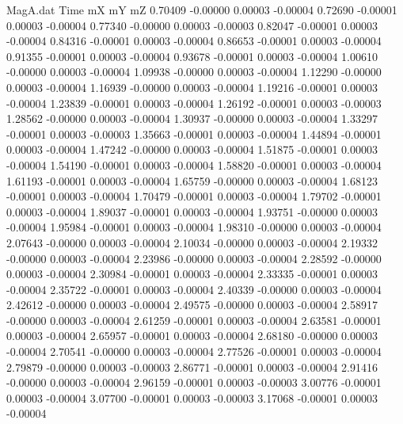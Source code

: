 \begin{filecontents}{MagA.dat}
Time mX mY mZ
   0.70409   -0.00000    0.00003   -0.00004
   0.72690   -0.00001    0.00003   -0.00004
   0.77340   -0.00000    0.00003   -0.00003
   0.82047   -0.00001    0.00003   -0.00004
   0.84316   -0.00001    0.00003   -0.00004
   0.86653   -0.00001    0.00003   -0.00004
   0.91355   -0.00001    0.00003   -0.00004
   0.93678   -0.00001    0.00003   -0.00004
   1.00610   -0.00000    0.00003   -0.00004
   1.09938   -0.00000    0.00003   -0.00004
   1.12290   -0.00000    0.00003   -0.00004
   1.16939   -0.00000    0.00003   -0.00004
   1.19216   -0.00001    0.00003   -0.00004
   1.23839   -0.00001    0.00003   -0.00004
   1.26192   -0.00001    0.00003   -0.00003
   1.28562   -0.00000    0.00003   -0.00004
   1.30937   -0.00000    0.00003   -0.00004
   1.33297   -0.00001    0.00003   -0.00003
   1.35663   -0.00001    0.00003   -0.00004
   1.44894   -0.00001    0.00003   -0.00004
   1.47242   -0.00000    0.00003   -0.00004
   1.51875   -0.00001    0.00003   -0.00004
   1.54190   -0.00001    0.00003   -0.00004
   1.58820   -0.00001    0.00003   -0.00004
   1.61193   -0.00001    0.00003   -0.00004
   1.65759   -0.00000    0.00003   -0.00004
   1.68123   -0.00001    0.00003   -0.00004
   1.70479   -0.00001    0.00003   -0.00004
   1.79702   -0.00001    0.00003   -0.00004
   1.89037   -0.00001    0.00003   -0.00004
   1.93751   -0.00000    0.00003   -0.00004
   1.95984   -0.00001    0.00003   -0.00004
   1.98310   -0.00000    0.00003   -0.00004
   2.07643   -0.00000    0.00003   -0.00004
   2.10034   -0.00000    0.00003   -0.00004
   2.19332   -0.00000    0.00003   -0.00004
   2.23986   -0.00000    0.00003   -0.00004
   2.28592   -0.00000    0.00003   -0.00004
   2.30984   -0.00001    0.00003   -0.00004
   2.33335   -0.00001    0.00003   -0.00004
   2.35722   -0.00001    0.00003   -0.00004
   2.40339   -0.00000    0.00003   -0.00004
   2.42612   -0.00000    0.00003   -0.00004
   2.49575   -0.00000    0.00003   -0.00004
   2.58917   -0.00000    0.00003   -0.00004
   2.61259   -0.00001    0.00003   -0.00004
   2.63581   -0.00001    0.00003   -0.00004
   2.65957   -0.00001    0.00003   -0.00004
   2.68180   -0.00000    0.00003   -0.00004
   2.70541   -0.00000    0.00003   -0.00004
   2.77526   -0.00001    0.00003   -0.00004
   2.79879   -0.00000    0.00003   -0.00003
   2.86771   -0.00001    0.00003   -0.00004
   2.91416   -0.00000    0.00003   -0.00004
   2.96159   -0.00001    0.00003   -0.00003
   3.00776   -0.00001    0.00003   -0.00004
   3.07700   -0.00001    0.00003   -0.00003
   3.17068   -0.00001    0.00003   -0.00004

\end{filecontents}
